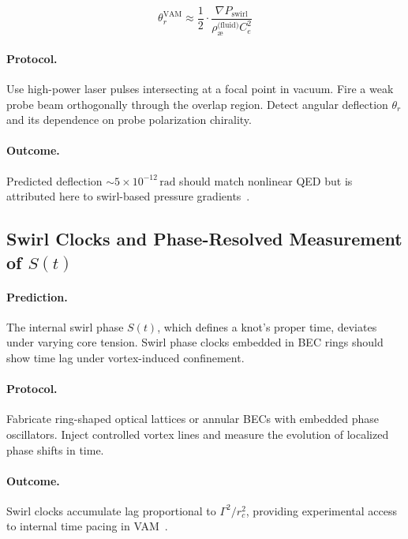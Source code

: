 \documentclass[12pt]{article}
\begin{document}
            \begin{equation}
                \boxed{
                    \theta_r^{\text{VAM}} \approx \frac{1}{2} \cdot \frac{\nabla P_{\text{swirl}}}{\rho_{\text{\ae}}^{\text{(fluid)}} C_e^2}
                }
            \label{eq:optical_deflection}
            \end{equation}
        
            \paragraph{Protocol.}
            Use high-power laser pulses intersecting at a focal point in vacuum. Fire a weak probe beam orthogonally through the overlap region. Detect angular deflection \( \theta_r \) and its dependence on probe polarization chirality.
        
            \paragraph{Outcome.}
            Predicted deflection \( \sim 5 \times 10^{-12} \, \text{rad} \) should match nonlinear QED but is attributed here to swirl-based pressure gradients~\cite{moffatt1969knottedness}.
        
            \subsection{Swirl Clocks and Phase-Resolved Measurement of \( S(t) \)}
        
            \paragraph{Prediction.}
            The internal swirl phase \( S(t) \), which defines a knot’s proper time, deviates under varying core tension. Swirl phase clocks embedded in BEC rings should show time lag under vortex-induced confinement.
        
            \paragraph{Protocol.}
            Fabricate ring-shaped optical lattices or annular BECs with embedded phase oscillators. Inject controlled vortex lines and measure the evolution of localized phase shifts in time.
        
            \paragraph{Outcome.}
            Swirl clocks accumulate lag proportional to \( \Gamma^2 / r_c^2 \), providing experimental access to internal time pacing in VAM~\cite{volovik2003universe}.
        
\end{document}
